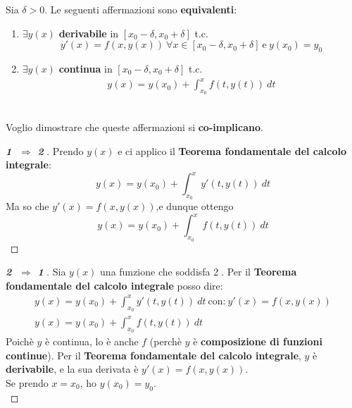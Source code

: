 \documentclass[a4paper, oneside]{article}
\begin{document}
    \begin{lemma}
        Sia $\delta>0$. Le seguenti affermazioni sono \textbf{equivalenti}:
        \begin{enumerate}
            \item $\exists y(x)$ \textbf{derivabile} in $[x_0-\delta,x_0+\delta]$ t.c.
            \[y'(x) = f\left(x,y(x)\right) \ \forall x \in [x_0-\delta,x_0+\delta] \ \text{e} \ y(x_0)=y_0\]

            \item $\exists y(x)$ \textbf{continua} in $[x_0-\delta,x_0+\delta]$ t.c.
            \begin{gather*}
                y(x) = y(x_0) + \int_{x_0}^{x} f\left(t,y(t)\right) \ dt
            \end{gather*}
        \end{enumerate}

            \hfil\\\noindent
            Voglio dimostrare che queste affermazioni si \textbf{co-implicano}.
            \begin{proof}[\textbf{\textcircled{1} $\Rightarrow$ \textcircled{2}}]
                Prendo $y(x)$ e ci applico il \textbf{Teorema fondamentale del calcolo integrale}:
                \[y(x) = y(x_0) + \int_{x_0}^{x} y'\left(t,y(t)\right) \ dt\]
                Ma so che $y'(x) = f\left(x,y(x)\right)$,e dunque ottengo
                \[y(x) = y(x_0) + \int_{x_0}^{x} f\left(t,y(t)\right) \ dt\]
            \end{proof}
            \begin{proof}[\textbf{\textcircled{2} $\Rightarrow$ \textcircled{1}}]
                Sia $y(x)$ una funzione che soddisfa \textcircled{2}. Per il \textbf{Teorema fondamentale del calcolo integrale}
                posso dire:
            \begin{gather*}
                y(x) = y(x_0) + \int_{x_0}^{x} y'\left(t,y(t)\right) \ dt \ \text{con:} \ y'(x) = f\left(x,y(x)\right)\\
                y(x) = y(x_0) + \int_{x_0}^{x} f\left(t,y(t)\right) \ dt
            \end{gather*}
                Poichè $y$ è continua, lo è anche $f$ (perchè $y$ è \textbf{composizione di funzioni continue}). Per il 
                \textbf{Teorema fondamentale del calcolo integrale}, $y$ è \textbf{derivabile}, e la sua derivata è 
                $y'(x) = f\left(x,y(x)\right)$.\\
                Se prendo $x=x_0$, ho $y(x_0) = y_0$.\\
            \end{proof}
    \end{lemma}
\end{document}
